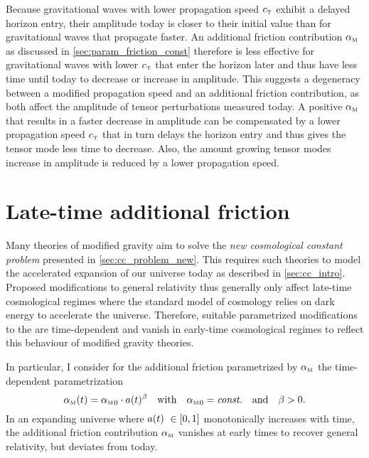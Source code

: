 \documentclass[12pt,parskip=half]{scrreprt}
\begin{document}
Because gravitational waves with lower propagation speed \({c_{\textnormal{\tiny{T}}}}\) exhibit a delayed horizon entry, their amplitude today is closer to their initial value than for gravitational waves that propagate faster. An additional friction contribution \({\alpha_{\textnormal{\tiny{M}}}}\) as discussed in \autoref{sec:param_friction_const} therefore is less effective for gravitational waves with lower \({c_{\textnormal{\tiny{T}}}}\) that enter the horizon later and thus have less time until today to decrease or increase in amplitude. This suggests a degeneracy between a modified propagation speed and an additional friction contribution, as both affect the amplitude of tensor perturbations measured today. A positive \({\alpha_{\textnormal{\tiny{M}}}}\) that results in a faster decrease in amplitude can be compensated by a lower propagation speed \({c_{\textnormal{\tiny{T}}}}\) that in turn delays the horizon entry and thus gives the tensor mode less time to decrease. Also, the amount growing tensor modes increase in amplitude is reduced by a lower propagation speed.



\section{Late-time additional friction}\label{sec:param_friction_late}

Many theories of modified gravity aim to solve the \emph{new cosmological constant problem} presented in \autoref{sec:cc_problem_new}. This requires such theories to model the accelerated expansion of our universe today as described in \autoref{sec:cc_intro}. Proposed modifications to general relativity thus generally only affect late-time cosmological regimes  where the \LCDM standard model of cosmology relies on dark energy to accelerate the universe. Therefore, suitable parametrized modifications to the  are time-dependent and vanish in early-time cosmological regimes to reflect this behaviour of modified gravity theories.

In particular, I consider for the additional friction parametrized by \({\alpha_{\textnormal{\tiny{M}}}}\) the time-dependent pa\-ra\-me\-tri\-za\-tion
\begin{equation}\label{eq:friction_param_powerlaw}
	{\alpha_{\textnormal{\tiny{M}}}}(t) = {\alpha_{\textnormal{\tiny{M}}}}_0 \cdot a(t)^\beta \quad \text{with} \quad {\alpha_{\textnormal{\tiny{M}}}}_0 = \textnormal{\textit{const.}} \quad \text{and} \quad \beta > 0
	\mathpunct{.}
\end{equation}
In an expanding universe where \(a(t) \in \sbr{0,1}\) monotonically increases with time, the additional friction contribution \({\alpha_{\textnormal{\tiny{M}}}}\) vanishes at early times to recover general relativity, but deviates from \LCDM today.
\end{document}
